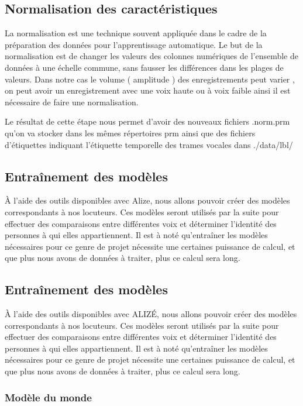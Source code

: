 \documentclass[a4paper, 12pt]{book}
\begin{document}
\subsection{Normalisation des caractéristiques}

La normalisation est une technique souvent appliquée dans le cadre de la préparation des données pour l'apprentissage automatique. Le but de la normalisation est de changer les valeurs des colonnes numériques de l'ensemble de données à une échelle commune, sans fausser les différences dans les plages de valeurs. Dans notre cas le volume (  amplitude ) des enregistrements peut varier , on peut avoir un enregistrement avec une voix haute ou à voix faible ainsi il est nécessaire de faire une normalisation.

Le résultat de cette étape nous permet d'avoir des nouveaux fichiers .norm.prm qu’on va stocker dans les mêmes répertoires prm ainsi que des fichiers d'étiquettes indiquant l'étiquette temporelle des trames vocales dans ./data/lbl/

\subsection{Entraînement des modèles}

À l'aide des outils disponibles avec Alize, nous allons pouvoir créer des modèles correspondants à nos locuteurs. Ces modèles seront utilisés par la suite pour effectuer des comparaisons entre différentes voix et déterminer l'identité des personnes à qui elles appartiennent. Il est à noté qu'entraîner les modèles nécessaires pour ce genre de projet nécessite une certaines puissance de calcul, et que plus nous avons de données à traiter, plus ce calcul sera long.


\subsection{Entraînement des modèles}

À l'aide des outils disponibles avec ALIZÉ, nous allons pouvoir créer des modèles correspondants à nos locuteurs. Ces modèles seront utilisés par la suite pour effectuer des comparaisons entre différentes voix et déterminer l'identité des personnes à qui elles appartiennent. Il est à noté qu'entraîner les modèles nécessaires pour ce genre de projet nécessite une certaines puissance de calcul, et que plus nous avons de données à traiter, plus ce calcul sera long.

\subsubsection{Modèle du monde}
\end{document}
